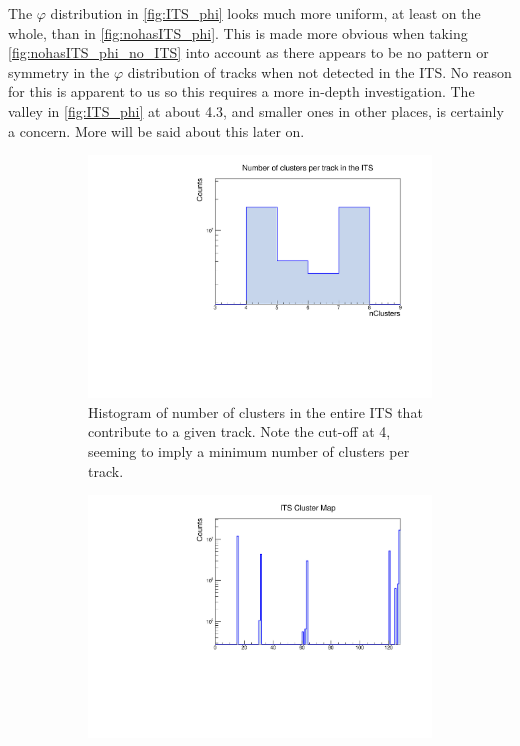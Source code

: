 The $\varphi$ distribution in \cref{fig:ITS_phi} looks much more uniform, at least on the whole, than in \cref{fig:nohasITS_phi}. This is made more obvious when taking \cref{fig:nohasITS_phi_no_ITS} into account as there appears to be no pattern or symmetry in the $\varphi$ distribution of tracks when not detected in the ITS. No reason for this is apparent to us so this requires a more in-depth investigation. The valley in \cref{fig:ITS_phi} at about 4.3, and smaller ones in other places, is certainly a concern. More will be said about this later on.



\begin{figure}[h]%
    \centering
    \begin{subfigure}[t]{.49\linewidth}
        \centering
        \includegraphics[width=\linewidth]{Plots/pass4_TracksIU/itsNCls.pdf}
        \caption{Histogram of number of clusters in the entire ITS that contribute to a given track. Note the cut-off at 4, seeming to imply a minimum number of clusters per track.}
        \label{fig:ITS_NCls}
    \end{subfigure}
    \hfill
    \begin{subfigure}[t]{.49\linewidth}
        \centering
        \includegraphics[width=\linewidth]{Plots/pass4_TracksIU/itsClusterMap.pdf}

\end{subfigure}
\end{figure}
